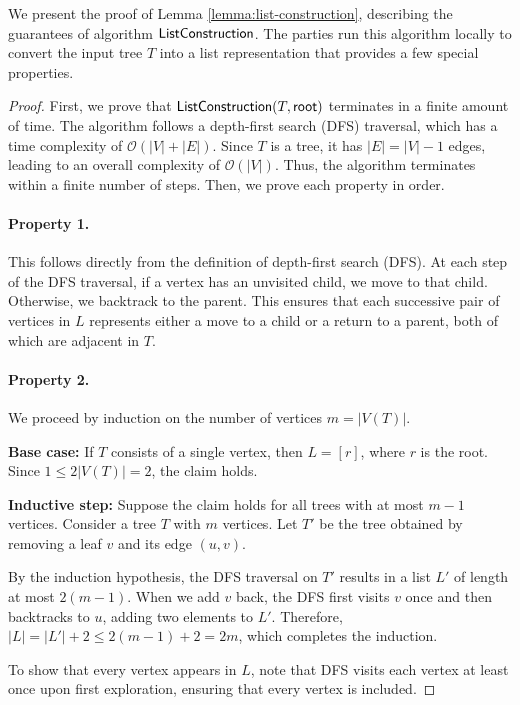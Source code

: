 We present the proof of Lemma \ref{lemma:list-construction}, describing the guarantees of algorithm $\textsf{ListConstruction}$. The parties run this algorithm locally to convert the input tree $T$ into a list representation that provides a few special properties.
\ListConstruction*
\begin{proof}
First, we prove that $\textsf{ListConstruction}(T, \textsf{root})$ terminates in a finite amount of time. The algorithm follows a depth-first search (DFS) traversal, which has a time complexity of $\mathcal{O}(|V| + |E|)$. Since $T$ is a tree, it has $|E| = |V| - 1$ edges, leading to an overall complexity of $\mathcal{O}(|V|)$. Thus, the algorithm terminates within a finite number of steps. Then, we prove each property in order.

\paragraph{Property 1.} This follows directly from the definition of depth-first search (DFS). At each step of the DFS traversal, if a vertex has an unvisited child, we move to that child. Otherwise, we backtrack to the parent. This ensures that each successive pair of vertices in $L$ represents either a move to a child or a return to a parent, both of which are adjacent in $T$.

\paragraph{Property 2.} We proceed by induction on the number of vertices $m = |V(T)|$. 

\textbf{Base case:} If $T$ consists of a single vertex, then $L = [r]$, where $r$ is the root. Since $1 \leq 2|V(T)| = 2$, the claim holds.

\textbf{Inductive step:} Suppose the claim holds for all trees with at most $m-1$ vertices. Consider a tree $T$ with $m$ vertices. Let $T'$ be the tree obtained by removing a leaf $v$ and its edge $(u,v)$.

By the induction hypothesis, the DFS traversal on $T'$ results in a list $L'$ of length at most $2(m-1)$. When we add $v$ back, the DFS first visits $v$ once and then backtracks to $u$, adding two elements to $L'$. Therefore, $|L| = |L'| + 2 \leq 2(m-1) + 2 = 2m$, which completes the induction.

To show that every vertex appears in $L$, note that DFS visits each vertex at least once upon first exploration, ensuring that every vertex is included.


\end{proof}
